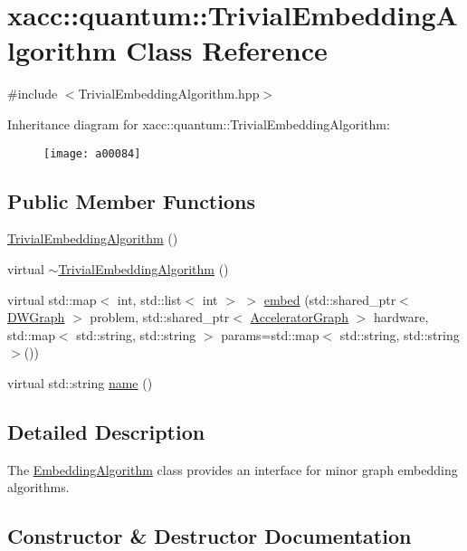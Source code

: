 \hypertarget{a00084}{}\section{xacc\+:\+:quantum\+:\+:Trivial\+Embedding\+Algorithm Class Reference}
\label{a00084}


{\ttfamily \#include $<$Trivial\+Embedding\+Algorithm.\+hpp$>$}

Inheritance diagram for xacc\+:\+:quantum\+:\+:Trivial\+Embedding\+Algorithm\+:\begin{figure}[H]
\begin{center}
\leavevmode
\texttt{[image: a00084]}
\end{center}
\end{figure}
\subsection*{Public Member Functions}
\begin{DoxyCompactItemize}
\item 
\hyperlink{a00084_aa704a3dc5825db1b023c54d84ec0f883}{Trivial\+Embedding\+Algorithm} ()
\item 
virtual \hyperlink{a00084_a692614cae332c77ae46e059b66d6f79c}{$\sim$\+Trivial\+Embedding\+Algorithm} ()
\item 
virtual std\+::map$<$ int, std\+::list$<$ int $>$ $>$ \hyperlink{a00084_a09e162a745528ffa3ea847dd5afee45b}{embed} (std\+::shared\+\_\+ptr$<$ \hyperlink{a00030}{D\+W\+Graph} $>$ problem, std\+::shared\+\_\+ptr$<$ \hyperlink{a00044}{Accelerator\+Graph} $>$ hardware, std\+::map$<$ std\+::string, std\+::string $>$ params=std\+::map$<$ std\+::string, std\+::string $>$())
\item 
virtual std\+::string \hyperlink{a00084_a5d3e8c56b53cda9c682dedc534bf38fb}{name} ()
\end{DoxyCompactItemize}


\subsection{Detailed Description}
The \hyperlink{a00037}{Embedding\+Algorithm} class provides an interface for minor graph embedding algorithms. 

\subsection{Constructor \& Destructor Documentation}
